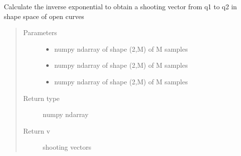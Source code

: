 \documentclass[letterpaper,10pt,english]{sphinxmanual}
\begin{document}

\begin{fulllineitems}
\label{\detokenize{curve_functions:curve_functions.inverse_exp}}
Calculate the inverse exponential to obtain a shooting vector from
q1 to q2 in shape space of open curves
\begin{quote}\begin{description}
\item[{Parameters}] \leavevmode\begin{itemize}
\item {} 
 \textendash{} numpy ndarray of shape (2,M) of M samples

\item {} 
 \textendash{} numpy ndarray of shape (2,M) of M samples

\item {} 
 \textendash{} numpy ndarray of shape (2,M) of M samples

\end{itemize}

\item[{Return type}] \leavevmode
numpy ndarray

\item[{Return v}] \leavevmode
shooting vectors

\end{description}\end{quote}

\end{fulllineitems}

\end{document}

